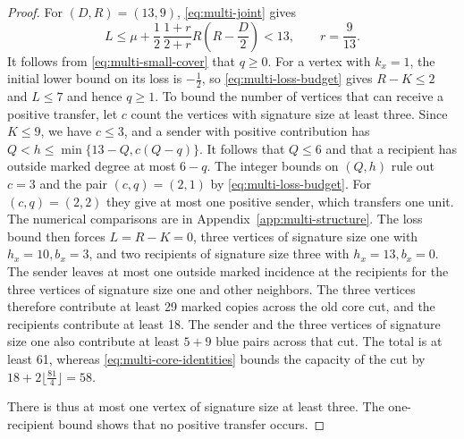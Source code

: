 \begin{proof}
For $(D,R)=(13,9)$, \eqref{eq:multi-joint} gives
\[
 L\le \mu+\frac{1}{2}\,\frac{1+r}{2+r}R(R-\frac{D}{2})<13,\qquad r=\frac{9}{13} .
\]
It follows from \eqref{eq:multi-small-cover} that $q\ge0$.
For a vertex with $k_x=1$, the initial lower bound on its loss is $-\frac{1}{2}$, so
\eqref{eq:multi-loss-budget} gives $R-K\le2$ and $L\le7$ and
hence $q\ge1$. To bound the number of vertices that can receive a positive transfer,
let $c$ count the vertices with signature size at least three.
Since $K\le9$, we have $c\le3$, and a sender with positive
contribution has $Q<h\le\min\{13-Q,c(Q-q)\}$. It follows that
$Q\le6$ and that a recipient has outside marked degree at most
$6-q$. The integer bounds on $(Q,h)$ rule out $c=3$ and
the pair $(c,q)=(2,1)$ by \eqref{eq:multi-loss-budget}. For
$(c,q)=(2,2)$ they give at most one positive sender, which transfers
one unit. The numerical comparisons are in Appendix~\ref{app:multi-structure}.
The loss bound then forces $L=R-K=0$, three vertices of signature
size one with $h_x=10,b_x=3$, and two recipients of signature
size three with $h_x=13,b_x=0$. The sender leaves at most one
outside marked incidence at the recipients for the three vertices
of signature size one and other neighbors. The three vertices
therefore contribute at least 29 marked copies across the old
core cut, and the recipients contribute at least 18. The sender
and the three vertices of signature size one also contribute at
least $5+9$ blue pairs across that cut. The total is at least 61,
whereas \eqref{eq:multi-core-identities} bounds the capacity of
the cut by $18+2\lfloor\frac{81}{4}\rfloor=58$.

There is thus at most one vertex of signature size at least three.
The one-recipient bound shows that no positive transfer occurs.


\end{proof}
